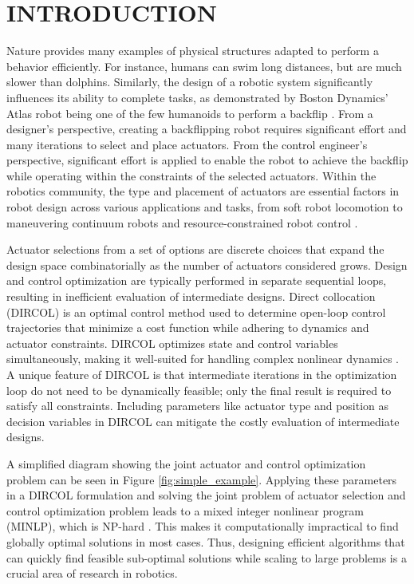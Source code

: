 \documentclass[runningheads]{llncs}
\begin{document}
\section{INTRODUCTION}

Nature provides many examples of physical structures adapted to perform a behavior efficiently. For instance, humans can swim long distances, but are much slower than dolphins. Similarly, the design of a robotic system significantly influences its ability to complete tasks, as demonstrated by Boston Dynamics’ Atlas robot being one of the few humanoids to perform a backflip \cite{noauthor_leaps_nodate}. From a designer’s perspective, creating a backflipping robot requires significant effort and many iterations to select and place actuators. From the control engineer’s perspective, significant effort is applied to enable the robot to achieve the backflip while operating within the constraints of the selected actuators. Within the robotics community, the type and placement of actuators are essential factors in robot design across various applications and tasks, from soft robot locomotion \cite{Bhatia2021} to maneuvering continuum robots \cite{baykal_asymptotically_2019, a_kuntz_kinematic_2018, c_bergeles_concentric_2015, t_anor_algorithms_2011, j_-t_lin_generalized_2022, morimoto_toward_2018, s_niyaz_optimizing_2019} and resource-constrained robot control \cite{Seifried2012}. 

Actuator selections from a set of options are discrete choices that expand the design space combinatorially as the number of actuators considered grows. Design and control optimization are typically performed in separate sequential loops, resulting in inefficient evaluation of intermediate designs. Direct collocation (DIRCOL) is an optimal control method used to determine open-loop control trajectories that minimize a cost function while adhering to dynamics and actuator constraints. DIRCOL optimizes state and control variables simultaneously, making it well-suited for handling complex nonlinear dynamics \cite{hargraves1987}. A unique feature of DIRCOL is that intermediate iterations in the optimization loop do not need to be dynamically feasible; only the final result is required to satisfy all constraints. Including parameters like actuator type and position as decision variables in DIRCOL can mitigate the costly evaluation of intermediate designs.

A simplified diagram showing the joint actuator and control optimization problem can be seen in Figure \ref{fig:simple_example}. Applying these parameters in a DIRCOL formulation and solving the joint problem of actuator selection and control optimization problem leads to a mixed integer nonlinear program (MINLP), which is NP-hard \cite{olshevsky2014minimal}. This makes it computationally impractical to find globally optimal solutions in most cases. Thus, designing efficient algorithms that can quickly find feasible sub-optimal solutions while scaling to large problems is a crucial area of research in robotics. 
\end{document}
